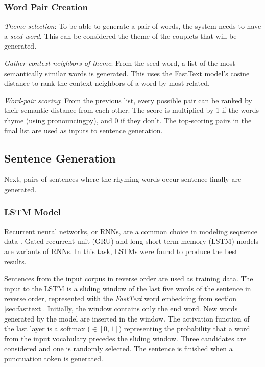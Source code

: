 \documentclass[11pt,a4paper]{article}
\newenvironment{tight_enumerate}{
\begin{enumerate}
\setlength{\itemsep}{0pt}
\setlength{\parskip}{0pt}
}{\end{enumerate}}
\begin{document}
\subsubsection{Word Pair Creation}
\begin{tight_enumerate}
	\item \textit{Theme selection}: To be able to generate a pair of words, the system needs to have a \textit{seed word}. This can be considered the theme of the couplets that will be generated.
	\item \textit{Gather context neighbors of theme}: From the seed word, a list of the most semantically similar words is generated. This uses the FastText model's cosine distance to rank the context neighbors of a word by most related.
	\item \textit{Word-pair scoring}: From the previous list, every possible pair can be ranked by their semantic distance from each other. The score is multiplied by 1 if the words rhyme (using pronouncingpy), and 0 if they don't. The top-scoring pairs in the final list are used as inputs to sentence generation.
\end{tight_enumerate}

\subsection{Sentence Generation}
\label{sec:languagegen}

Next, pairs of sentences where the rhyming words occur sentence-finally are generated.

\subsubsection{LSTM Model}
\label{sec:lstm}
Recurrent neural networks, or RNNs, are a common choice in modeling sequence data \cite{rnn}. Gated recurrent unit (GRU) \cite{gru} and long-short-term-memory (LSTM) models \cite{lstm} are variants of RNNs. In this task, LSTMs were found to produce the best results.

Sentences from the input corpus in reverse order are used as training data. The input to the LSTM is a sliding window of the last five words of the sentence in reverse order, represented with the \textit{FastText} word embedding from section \ref{sec:fasttext}. Initially, the window contains only the end word. New words generated by the model are inserted in the window. The activation function of the last layer is a softmax ($\in [0, 1]$) representing the probability that a word from the input vocabulary precedes the sliding window. Three candidates are considered and one is randomly selected. The sentence is finished when a punctuation token is generated.
\end{document}
